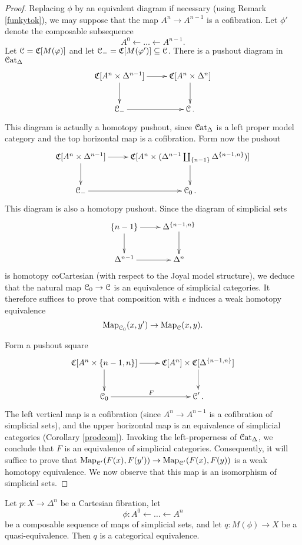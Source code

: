 \begin{proof}
Replacing $\phi$ by an equivalent diagram if necessary (using Remark \ref{funkytok}), we may suppose that the map $A^n \rightarrow A^{n-1}$ is a cofibration. Let $\phi'$ denote the composable subsequence
$$ A^0 \leftarrow \ldots \leftarrow A^{n-1}.$$
Let $\operatorname{\mathcal{C}} = \operatorname{\mathfrak{C}}[M(\varphi)]$ and let
$\operatorname{\mathcal{C}}_{-} = \operatorname{\mathfrak{C}}[M(\varphi')] \subseteq \operatorname{\mathcal{C}}$. There is a pushout diagram in $\operatorname{\mathcal{C}at_{\Delta}}$
$$ \xymatrix{ \sCoNerve[A^n \times \Delta^{n-1}] \ar[r] \ar[d] & \sCoNerve[ A^n \times \Delta^n] \ar[d] \\
\calC_{-} \ar[r] & \calC. }$$
This diagram is actually a homotopy pushout, since $\operatorname{\mathcal{C}at_{\Delta}}$ is a left proper model category
and the top horizontal map is a cofibration. Form now the pushout
$$ \xymatrix{ \sCoNerve[ A^n \times \Delta^{n-1}] \ar[d] \ar[r] & \sCoNerve[ A^n \times ( \Delta^{n-1} 
\coprod_{ \{n-1\} } \Delta^{ \{n-1, n\} } )] \ar[d] \\
\calC_{-} \ar[r] & \calC_0. }$$
This diagram is also a homotopy pushout. Since the diagram of simplicial sets
$$ \xymatrix{  \{n-1\} \ar[r] \ar[d] & \Delta^{ \{n-1,n\} } \ar[d] \\
\Delta^{n-1} \ar[r] & \Delta^n } $$
is homotopy coCartesian (with respect to the Joyal model structure), we deduce that the natural
map $\operatorname{\mathcal{C}}_0 \rightarrow \operatorname{\mathcal{C}}$ is an equivalence of simplicial categories. It therefore suffices
to prove that composition with $e$ induces a weak homotopy equivalence
$$ \operatorname{{Map}}_{\operatorname{\mathcal{C}}_0}(x,y') \rightarrow \operatorname{{Map}}_{\operatorname{\mathcal{C}}}(x,y).$$

Form a pushout square
$$ \xymatrix{ \sCoNerve[ A^{n} \times \{n-1,n\} ] \ar[r] \ar[d] & \sCoNerve[ A^n] \times \sCoNerve[ \Delta^{ \{n-1,n\} } ] \ar[d] \\
\calC_0 \ar[r]^{F} & \calC'. }$$
The left vertical map is a cofibration (since $A^n \rightarrow A^{n-1}$ is a cofibration of simplicial sets), and the upper horizontal map is an equivalence of simplicial categories (Corollary \ref{prodcom}). Invoking the left-properness of $\operatorname{\mathcal{C}at_{\Delta}}$, we conclude that $F$ is an equivalence of simplicial categories. Consequently, it will suffice to prove
that $\operatorname{{Map}}_{\operatorname{\mathcal{C}}'}( F(x), F(y')) \rightarrow \operatorname{{Map}}_{\operatorname{\mathcal{C}}'}(F(x),F(y))$ is a weak homotopy equivalence. We now observe that this map is an isomorphism of simplicial sets.
\end{proof}

\begin{proposition}\label{qequiv}
Let $p: X \rightarrow \Delta^n$ be a Cartesian fibration, let
$$ \phi: A^0 \leftarrow \ldots \leftarrow A^n$$ be a composable
sequence of maps of simplicial sets, and let $q: M(\phi)
\rightarrow X$ be a quasi-equivalence. Then $q$ is a categorical
equivalence.
\end{proposition}

